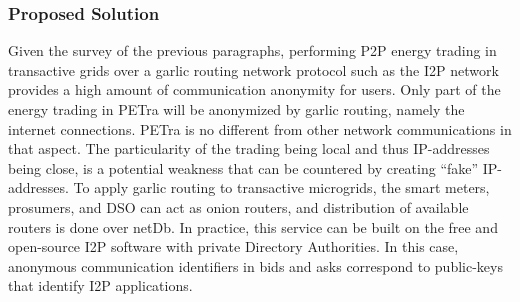  
\subsubsection{Proposed Solution}
Given the survey of the previous paragraphs, performing P2P energy trading in transactive grids over a garlic routing network protocol such as the I2P network provides a high amount of communication anonymity for users. Only part of the energy trading in PETra will be anonymized by garlic routing, namely the internet connections. PETra is no different from other network communications in that aspect. The particularity of the trading being local and thus IP-addresses being close, is a potential weakness that can be countered by creating ``fake'' IP-addresses. To apply garlic routing to transactive microgrids, the smart meters, prosumers, and DSO can act as onion routers, and distribution of available routers is done over netDb. In practice, this service
can be built on the free and open-source I2P software
 with private
Directory Authorities.  In this case, anonymous communication
identifiers in bids and asks correspond to public-keys that identify
I2P applications.


